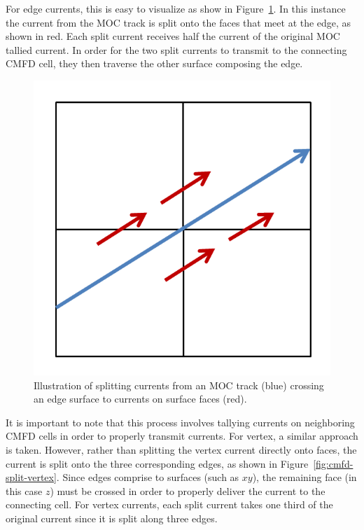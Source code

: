 For edge currents, this is easy to visualize as show in Figure~\ref{fig:cmfd-split-edge}. In this instance the current from the \ac{MOC} track is split onto the faces that meet at the edge, as shown in red. Each split current receives half the current of the original \ac{MOC} tallied current. In order for the two split currents to transmit to the connecting \ac{CMFD} cell, they then traverse the other surface composing the edge.

\begin{figure}[h!]
	\centering
	\includegraphics[width=0.6\linewidth]{figures/DD/edge-split.PNG}
	\caption[]{Illustration of splitting currents from an \ac{MOC} track (blue) crossing an edge surface to currents on surface faces (red).}
	\label{fig:cmfd-split-edge}
\end{figure}


It is important to note that this process involves tallying currents on neighboring \ac{CMFD} cells in order to properly transmit currents. For vertex, a similar approach is taken. However, rather than splitting the vertex current directly onto faces, the current is split onto the three corresponding edges, as shown in Figure~\ref{fig:cmfd-split-vertex}. Since edges comprise to surfaces (such as $xy$), the remaining face (in this case $z$) must be crossed in order to properly deliver the current to the connecting cell. For vertex currents, each split current takes one third of the original current since it is split along three edges.


